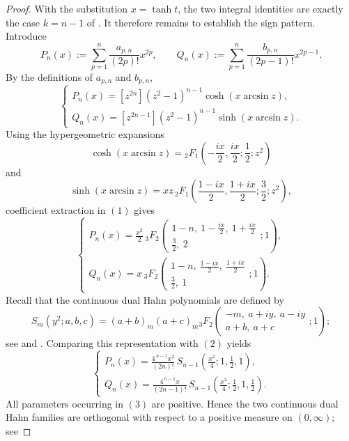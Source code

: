 \documentclass[11pt,twoside]{article}
\numberwithin{equation}{section}
\begin{document}
\begin{proof} With the substitution \(x=\tanh t\), the two integral identities are exactly the case \(k=n-1\) of \cite[Cor.~1.3]{TallaWaffo2026}.  It therefore remains to establish the sign pattern. Introduce
\[
P_n(x) := \sum_{p=1}^{n}\frac{a_{p,n}}{(2p)!}x^{2p}, \qquad Q_n(x) := \sum_{p=1}^{n}\frac{b_{p,n}}{(2p-1)!}x^{2p-1}.
\]
By the definitions of \(a_{p,n}\) and \(b_{p,n}\),
\[
\begin{cases} \displaystyle P_n(x) = [z^{2n}](z^2-1)^{n-1}\cosh(x\arcsin z),\\[2mm] \displaystyle Q_n(x) = [z^{2n-1}](z^2-1)^{n-1}\sinh(x\arcsin z).
\end{cases}
\tag{1}
\]
Using the hypergeometric expansions
\[
\cosh(x\arcsin z) = {}_2F_1\!\left( -\frac{ix}{2},\frac{ix}{2}; \frac12;z^2 \right)
\]
and
\[
\sinh(x\arcsin z) = xz\, {}_2F_1\!\left( \frac{1-ix}{2},\frac{1+ix}{2}; \frac32;z^2 \right),
\]
coefficient extraction in \((1)\) gives
\[
\begin{cases} \displaystyle P_n(x) = \frac{x^2}{2}\, {}_3F_2\!\left( \begin{matrix} 1-n,\ 1-\frac{ix}{2},\ 1+\frac{ix}{2}\\ \frac32,\ 2 \end{matrix};1 \right), \\[5mm] \displaystyle Q_n(x) = x\, {}_3F_2\!\left( \begin{matrix} 1-n,\ \frac{1-ix}{2},\ \frac{1+ix}{2}\\ \frac32,\ 1 \end{matrix};1 \right).
\end{cases}
\tag{2}
\]
Recall that the continuous dual Hahn polynomials are defined by
\[
S_m(y^2;a,b,c) = (a+b)_m(a+c)_m {}_3F_2\!\left( \begin{matrix} -m,\ a+iy,\ a-iy\\ a+b,\ a+c \end{matrix};1 \right);
\]
see \cite[Eq.~(18.26.2)]{NIST:DLMF} and \cite[\S9.3]{KoekoekLeskySwarttouw2010}. Comparing
this representation with \((2)\) yields
\[
\begin{cases} \displaystyle P_n(x) = \frac{4^{\,n-1}x^2}{(2n)!}\, S_{n-1}\!\left( \frac{x^2}{4};1,\frac12,1 \right), \\[4mm] \displaystyle Q_n(x) = \frac{4^{\,n-1}x}{(2n-1)!}\, S_{n-1}\!\left( \frac{x^2}{4};\frac12,1,\frac12 \right).
\end{cases}
\tag{3}
\]
All parameters occurring in \((3)\) are positive. Hence the two continuous dual Hahn
families are orthogonal with respect to a positive measure on \((0,\infty)\); see

\end{proof}
\end{document}
